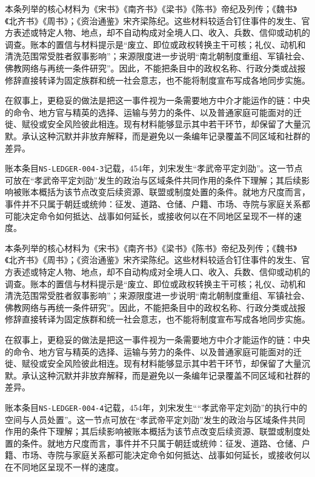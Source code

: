 本条列举的核心材料为《宋书》《南齐书》《梁书》《陈书》帝纪及列传；《魏书》《北齐书》《周书》；《资治通鉴》宋齐梁陈纪。这些材料较适合钉住事件的发生、官方表述或特定人物、地点，却不自动构成对全境人口、收入、兵数、信仰或动机的调查。账本的置信与材料提示是“废立、即位或政权转换主干可核；礼仪、动机和清洗范围常受胜者叙事影响”；来源限度进一步说明“南北朝制度重组、军镇社会、佛教网络与再统一条件研究”。因此，不能把条目中的政权名称、行政分类或战报修辞直接转译为固定族群和统一社会意志，也不能将制度宣布写成各地同步实施。

在叙事上，更稳妥的做法是把这一事件视为一条需要地方中介才能运作的链：中央的命令、地方官与精英的选择、运输与劳力的条件、以及普通家庭可能面对的迁徙、赋役或安全风险彼此相连。现有材料能够显示其中若干环节，却保留了大量沉默。承认这种沉默并非放弃解释，而是避免以一条编年记录覆盖不同区域和社群的差异。

账本条目\texttt{NS-LEDGER-004-3}记载，454年，刘宋发生“孝武帝平定刘劭”。这一节点可放在“孝武帝平定刘劭”发生的政治与区域条件共同作用的条件下理解；其后续影响被账本概括为该节点改变后续资源、联盟或制度处置的条件。就地方尺度而言，事件并不只属于朝廷或统帅：征发、道路、仓储、户籍、市场、寺院与家庭关系都可能决定命令如何抵达、战事如何延长，或接收何以在不同地区呈现不一样的速度。

本条列举的核心材料为《宋书》《南齐书》《梁书》《陈书》帝纪及列传；《魏书》《北齐书》《周书》；《资治通鉴》宋齐梁陈纪。这些材料较适合钉住事件的发生、官方表述或特定人物、地点，却不自动构成对全境人口、收入、兵数、信仰或动机的调查。账本的置信与材料提示是“废立、即位或政权转换主干可核；礼仪、动机和清洗范围常受胜者叙事影响”；来源限度进一步说明“南北朝制度重组、军镇社会、佛教网络与再统一条件研究”。因此，不能把条目中的政权名称、行政分类或战报修辞直接转译为固定族群和统一社会意志，也不能将制度宣布写成各地同步实施。

在叙事上，更稳妥的做法是把这一事件视为一条需要地方中介才能运作的链：中央的命令、地方官与精英的选择、运输与劳力的条件、以及普通家庭可能面对的迁徙、赋役或安全风险彼此相连。现有材料能够显示其中若干环节，却保留了大量沉默。承认这种沉默并非放弃解释，而是避免以一条编年记录覆盖不同区域和社群的差异。

账本条目\texttt{NS-LEDGER-004-4}记载，454年，刘宋发生““孝武帝平定刘劭”的执行中的空间与人员处置”。这一节点可放在“孝武帝平定刘劭”发生的政治与区域条件共同作用的条件下理解；其后续影响被账本概括为该节点改变后续资源、联盟或制度处置的条件。就地方尺度而言，事件并不只属于朝廷或统帅：征发、道路、仓储、户籍、市场、寺院与家庭关系都可能决定命令如何抵达、战事如何延长，或接收何以在不同地区呈现不一样的速度。

